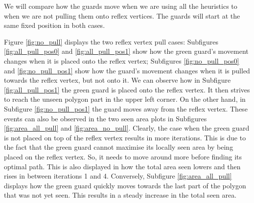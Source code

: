 We will compare how the guards move when we are using all the heuristics to when we are not pulling them onto reflex vertices. The guards will start at the same fixed position in both cases.

Figure \ref{fig:no_pull} displays the two reflex vertex pull cases: Subfigures \ref{fig:all_pull_pos0} and \ref{fig:all_pull_pos1} show how the green guard's movement changes when it is placed onto the reflex vertex; Subfigures \ref{fig:no_pull_pos0} and \ref{fig:no_pull_pos1} show how the guard's movement changes when it is pulled towards the reflex vertex, but not onto it. We can observe how in Subfigure \ref{fig:all_pull_pos1} the green guard is placed onto the reflex vertex. It then strives to reach the unseen polygon part in the upper left corner. On the other hand, in Subfigure \ref{fig:no_pull_pos1} the guard moves away from the reflex vertex. 
These events can also be observed in the two seen area plots in Subfigures \ref{fig:area_all_pull} and \ref{fig:area_no_pull}. Clearly, the case when the green guard is not placed on top of the reflex vertex results in more iterations. This is due to the fact that the green guard cannot maximise its locally seen area by being placed on the reflex vertex. So, it needs to move around more before finding its optimal path. This is also displayed in how the total area seen lowers and then rises in between iterations 1 and 4. Conversely, Subfigure \ref{fig:area_all_pull} displays how the green guard quickly moves towards the last part of the polygon that was not yet seen. This results in a steady increase in the total seen area.


